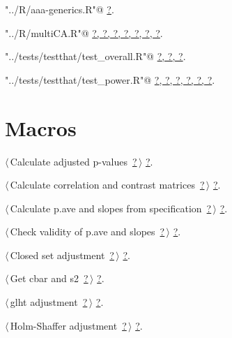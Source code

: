 \documentclass[reqno]{amsart}
\renewcommand{\NWlink}[2]{\hyperlink{#1}{#2}}
\begin{document}
{\small\begin{list}{}{\setlength{\itemsep}{-\parsep}\setlength{\itemindent}{-\leftmargin}}
\item \verb@"../R/aaa-generics.R"@ {\footnotesize {\NWtxtDefBy} \NWlink{nuweb?}{?}.}
\item \verb@"../R/multiCA.R"@ {\footnotesize {\NWtxtDefBy} \NWlink{nuweb?}{?}\NWlink{nuweb?}{, ?}\NWlink{nuweb?}{, ?}\NWlink{nuweb?}{, ?}\NWlink{nuweb?}{, ?}\NWlink{nuweb?}{, ?}\NWlink{nuweb?}{, ?}.
}
\item \verb@"../tests/testthat/test_overall.R"@ {\footnotesize {\NWtxtDefBy} \NWlink{nuweb?}{?}\NWlink{nuweb?}{, ?}\NWlink{nuweb?}{, ?}.
}
\item \verb@"../tests/testthat/test_power.R"@ {\footnotesize {\NWtxtDefBy} \NWlink{nuweb?}{?}\NWlink{nuweb?}{, ?}\NWlink{nuweb?}{, ?}\NWlink{nuweb?}{, ?}\NWlink{nuweb?}{, ?}\NWlink{nuweb?}{, ?}.
}
\end{list}}

\section{Macros}


{\small\begin{list}{}{\setlength{\itemsep}{-\parsep}\setlength{\itemindent}{-\leftmargin}}
\item $\langle\,$Calculate adjusted p-values\nobreak\ {\footnotesize \NWlink{nuweb?}{?}}$\,\rangle$ {\footnotesize {\NWtxtRefIn} \NWlink{nuweb?}{?}.}
\item $\langle\,$Calculate correlation and contrast matrices\nobreak\ {\footnotesize \NWlink{nuweb?}{?}}$\,\rangle$ {\footnotesize {\NWtxtRefIn} \NWlink{nuweb?}{?}.}
\item $\langle\,$Calculate p.ave and slopes from specification\nobreak\ {\footnotesize \NWlink{nuweb?}{?}}$\,\rangle$ {\footnotesize {\NWtxtRefIn} \NWlink{nuweb?}{?}.}
\item $\langle\,$Check validity of p.ave and slopes\nobreak\ {\footnotesize \NWlink{nuweb?}{?}}$\,\rangle$ {\footnotesize {\NWtxtRefIn} \NWlink{nuweb?}{?}.}
\item $\langle\,$Closed set adjustment\nobreak\ {\footnotesize \NWlink{nuweb?}{?}}$\,\rangle$ {\footnotesize {\NWtxtRefIn} \NWlink{nuweb?}{?}.}
\item $\langle\,$Get cbar and s2\nobreak\ {\footnotesize \NWlink{nuweb?}{?}}$\,\rangle$ {\footnotesize {\NWtxtRefIn} \NWlink{nuweb?}{?}.}
\item $\langle\,$glht adjustment\nobreak\ {\footnotesize \NWlink{nuweb?}{?}}$\,\rangle$ {\footnotesize {\NWtxtRefIn} \NWlink{nuweb?}{?}.}
\item $\langle\,$Holm-Shaffer adjustment\nobreak\ {\footnotesize \NWlink{nuweb?}{?}}$\,\rangle$ {\footnotesize {\NWtxtRefIn} \NWlink{nuweb?}{?}.}
\end{list}}
\end{document}
